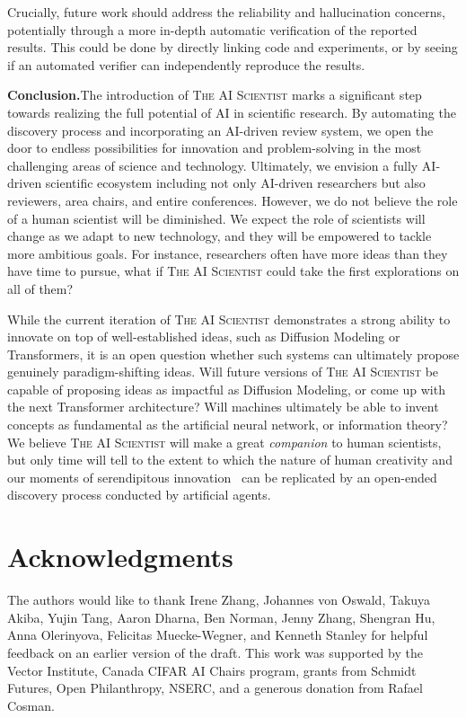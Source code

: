 \documentclass[11pt, a4paper]{include/gdm_format}
\newcommand{\ouralgo}{\textsc{The AI Scientist}\xspace}
\begin{document}
Crucially, future work should address the reliability and hallucination concerns, potentially through a more in-depth automatic verification of the reported results. This could be done by directly linking code and experiments, or by seeing if an automated verifier can independently reproduce the results.

%
%

\textbf{Conclusion.}\;The introduction of \ouralgo marks a significant step towards realizing the full potential of AI in scientific research. By automating the discovery process and incorporating an AI-driven review system, we open the door to endless possibilities for innovation and problem-solving in the most challenging areas of science and technology.
Ultimately, we envision a fully AI-driven scientific ecosystem including not only AI-driven researchers but also reviewers, area chairs, and entire conferences.
However, we do not believe the role of a human scientist will be diminished.
%
We expect the role of scientists will change as we adapt to new technology, and they will be empowered to tackle more ambitious goals.
For instance, researchers often have more ideas than they have time to pursue, what if \ouralgo could take the first explorations on all of them?

%
While the current iteration of \ouralgo demonstrates a strong ability to innovate on top of well-established ideas, such as Diffusion Modeling or Transformers, it is an open question whether such systems can ultimately propose genuinely paradigm-shifting ideas.
Will future versions of \ouralgo be capable of proposing ideas as impactful as Diffusion Modeling, or come up with the next Transformer architecture?
Will machines ultimately be able to invent concepts as fundamental as the artificial neural network, or information theory?
We believe \ouralgo will make a great \textit{companion} to human scientists, but only time will tell to the extent to which the nature of human creativity and our moments of serendipitous innovation~\citep{stanley2015greatness} can be replicated by an open-ended discovery process conducted by artificial agents.

\section*{Acknowledgments}
The authors would like to thank Irene Zhang, Johannes von Oswald, Takuya Akiba, Yujin Tang, Aaron Dharna, Ben Norman, Jenny Zhang, Shengran Hu, Anna Olerinyova, Felicitas Muecke-Wegner, and Kenneth Stanley for helpful feedback on an earlier version of the draft.
%
This work was supported by the Vector Institute, Canada CIFAR AI Chairs program, grants from Schmidt Futures, Open Philanthropy, NSERC, and a generous donation from Rafael Cosman.
\end{document}
